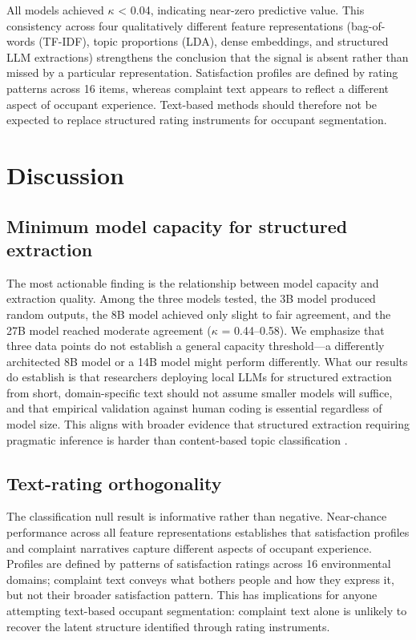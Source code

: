 \documentclass[sigconf]{acmart}
\begin{document}
All models achieved $\kappa$ < 0.04, indicating near-zero predictive value. This consistency across four qualitatively different feature representations (bag-of-words (TF-IDF), topic proportions (LDA), dense embeddings, and structured LLM extractions) strengthens the conclusion that the signal is absent rather than missed by a particular representation. Satisfaction profiles are defined by rating patterns across 16 items, whereas complaint text appears to reflect a different aspect of occupant experience. Text-based methods should therefore not be expected to replace structured rating instruments for occupant segmentation.

\section{Discussion}

\subsection{Minimum model capacity for structured extraction}
The most actionable finding is the relationship between model capacity and extraction quality. Among the three models tested, the 3B model produced random outputs, the 8B model achieved only slight to fair agreement, and the 27B model reached moderate agreement ($\kappa$ = 0.44--0.58). We emphasize that three data points do not establish a general capacity threshold---a differently architected 8B model or a 14B model might perform differently. What our results do establish is that researchers deploying local LLMs for structured extraction from short, domain-specific text should not assume smaller models will suffice, and that empirical validation against human coding is essential regardless of model size. This aligns with broader evidence that structured extraction requiring pragmatic inference is harder than content-based topic classification \cite{sadick2025}.

\subsection{Text-rating orthogonality}
The classification null result is informative rather than negative. Near-chance performance across all feature representations establishes that satisfaction profiles and complaint narratives capture different aspects of occupant experience. Profiles are defined by patterns of satisfaction ratings across 16 environmental domains; complaint text conveys what bothers people and how they express it, but not their broader satisfaction pattern. This has implications for anyone attempting text-based occupant segmentation: complaint text alone is unlikely to recover the latent structure identified through rating instruments.
\end{document}
